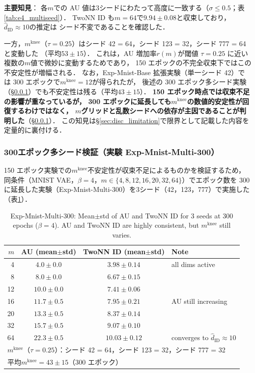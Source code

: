 \documentclass[11pt,a4paper]{jsarticle}
\newcommand{\mknee}{m^{\mathrm{knee}}}
\begin{document}
\textbf{主要知見}：
各$m$での AU 値は3シードにわたって高度に一致する（$\sigma \leq 0.5$；表\ref{tab:e4_multiseed}）．
TwoNN ID も$m = 64$で$9.94 \pm 0.08$と収束しており，$\hat{d}_\mathrm{ID} \approx 10$の推定は
シード不変であることを確認した．

一方，$\mknee$（$\tau = 0.25$）はシード 42 = 64，シード 123 = 32，シード 777 = 64 と変動した
（平均$53 \pm 15$）．
これは，AU 増加率$r(m)$が閾値 $\tau = 0.25$ に近い複数の$m$値で微妙に変動するためであり，
150 エポックの不完全収束下ではこの不安定性が増幅される．
なお，Exp-Mnist-Base 拡張実験（単一シード 42）では 300 エポックで$\mknee = 12$が得られたが，
後述の 300 エポック多シード実験（§\ref{sec:exp_multiseed2}）でも不安定性は残る（平均$43 \pm 15$）．
\textbf{150 エポック時点では収束不足の影響が重なっているが，
300 エポックに延長しても$\mknee$の数値的安定性が回復するわけではなく，
$m$グリッドと乱数シードへの依存が主因であることが判明した}（§\ref{sec:exp_multiseed2}）．
この知見は§\ref{sec:disc_limitation}で限界として記載した内容を定量的に裏付ける．

\subsubsection{300エポック多シード検証（実験 Exp-Mnist-Multi-300）}\label{sec:exp_multiseed2}

150 エポック実験での$\mknee$不安定性が収束不足によるものかを検証するため，
同条件（MNIST VAE，$\beta = 4$，$m \in \{4, 8, 12, 16, 20, 32, 64\}$）でエポック数を
300 に延長した実験（Exp-Mnist-Multi-300）を3シード（42，123，777）で実施した（表\ref{tab:e4_300ep_multiseed}）．

\begin{table}[H]
\centering
\caption{Exp-Mnist-Multi-300: Mean$\pm$std of AU and TwoNN ID for 3 seeds at 300 epochs ($\beta=4$). AU and TwoNN ID are highly consistent, but $\mknee$ still varies.}
\label{tab:e4_300ep_multiseed}
\small
\begin{tabular}{rccl}
\toprule
$m$ & AU (mean$\pm$std) & TwoNN ID (mean$\pm$std) & Note \\
\midrule
 4 & $4.0 \pm 0.0$ & $3.98 \pm 0.14$ & all dims active \\
 8 & $8.0 \pm 0.0$ & $6.67 \pm 0.15$ & \\
12 & $10.0 \pm 0.0$ & $7.41 \pm 0.06$ & \\
16 & $11.7 \pm 0.5$ & $7.95 \pm 0.21$ & AU still increasing \\
20 & $13.3 \pm 0.5$ & $8.37 \pm 0.14$ & \\
32 & $15.7 \pm 0.5$ & $9.07 \pm 0.10$ & \\
64 & $22.3 \pm 0.5$ & $10.03 \pm 0.12$ & converges to $\hat{d}_\mathrm{ID} \approx 10$ \\
\midrule
\multicolumn{4}{l}{$\mknee$（$\tau=0.25$）：シード 42 = 64，シード 123 = 32，シード 777 = 32} \\
\multicolumn{4}{l}{平均$\mknee = 43 \pm 15$（300 エポック）} \\
\bottomrule
\end{tabular}
\end{table}
\end{document}
